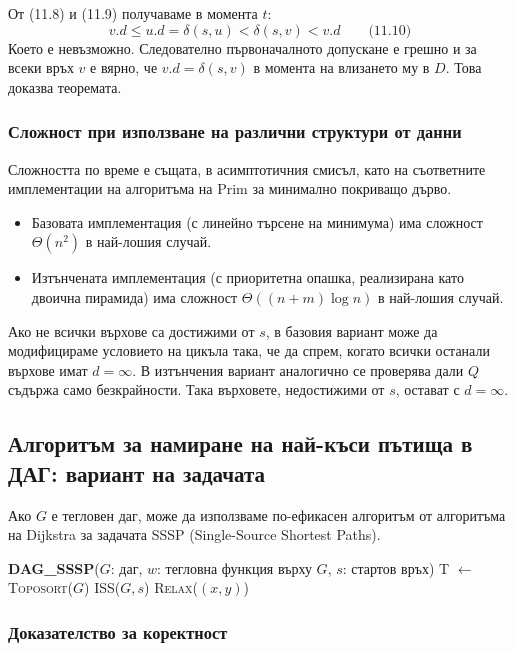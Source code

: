 \documentclass{article}
\renewcommand{\\}{\newline}
\begin{document}
    От (11.8) и (11.9) получаваме в момента \(t\):
    \[
    v.d \le u.d = \delta(s, u) < \delta(s, v) < v.d \qquad \text{(11.10)}
    \]
    Което е невъзможно. Следователно първоначалното допускане е грешно и за всеки връх \(v\) е вярно, че \(v.d = \delta(s, v)\) в момента на влизането му в \(D\). Това доказва теоремата.\subsubsection{Сложност при използване на различни структури от данни}

Сложността по време е същата, в асимптотичния смисъл, като на съответните имплементации на алгоритъма на Prim за минимално покриващо дърво.

\begin{itemize}
    \item Базовата имплементация (с линейно търсене на минимума) има сложност \(\Theta(n^2)\) в най-лошия случай.
    \item Изтънчената имплементация (с приоритетна опашка, реализирана като двоична пирамида) има сложност \(\Theta((n + m) \log n)\) в най-лошия случай.
\end{itemize}

Ако не всички върхове са достижими от \(s\), в базовия вариант може да модифицираме условието на цикъла така, че да спрем, когато всички останали върхове имат \(d = \infty\). В изтънчения вариант аналогично се проверява дали \(Q\) съдържа само безкрайности. Така върховете, недостижими от \(s\), остават с \(d = \infty\).
\newpage

\subsection{Алгоритъм за намиране на най-къси пътища в ДАГ: вариант на задачата}

Ако \(G\) е тегловен даг, може да използваме по-ефикасен алгоритъм от алгоритъма на Dijkstra за задачата SSSP (Single-Source Shortest Paths).

\begin{algorithmic}[1]
\State \textbf{DAG\_SSSP}(\(G\): даг, \(w\): тегловна функция върху \(G\), \(s\): стартов връх)
\State T \(\gets\) \textsc{Toposort}(\(G\))
\State \textsc{ISS}(\(G, s\))
        \State \textsc{Relax}(\((x, y)\))
    \EndFor
\EndFor
\end{algorithmic}

\subsubsection{Доказателство за коректност}
\end{document}

